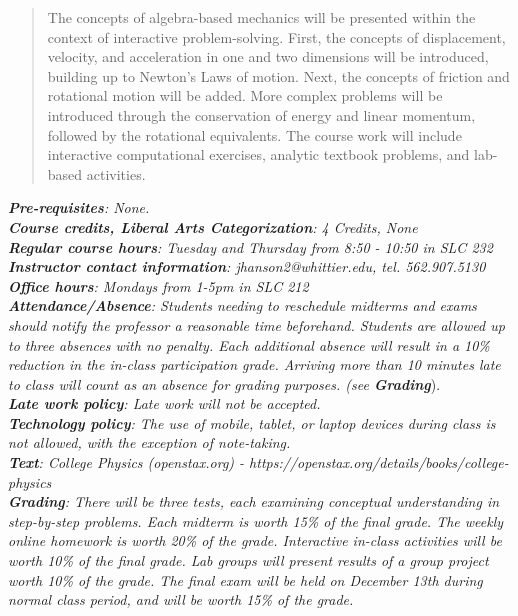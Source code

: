 \documentclass[10pt]{article}
\begin{document}
\maketitle

\begin{abstract}
The concepts of algebra-based mechanics will be presented within the context of interactive problem-solving.  First, the concepts of displacement, velocity, and acceleration in one and two dimensions will be introduced, building up to Newton's Laws of motion.  Next, the concepts of friction and rotational motion will be added.  More complex problems will be introduced through the conservation of energy and linear momentum, followed by the rotational equivalents.  The course work will include interactive computational exercises, analytic textbook problems, and lab-based activities.
\end{abstract}
\noindent
\textit{\textbf{Pre-requisites}: None.} \\
\textit{\textbf{Course credits, Liberal Arts Categorization}: 4 Credits, None} \\
\textit{\textbf{Regular course hours}: Tuesday and Thursday from 8:50 - 10:50 in SLC 232} \\
\textit{\textbf{Instructor contact information}: jhanson2@whittier.edu, tel. 562.907.5130} \\
\textit{\textbf{Office hours}: Mondays from 1-5pm in SLC 212} \\
\textit{\textbf{Attendance/Absence}: Students needing to reschedule midterms and exams should notify the professor a reasonable time beforehand.  Students are allowed up to three absences with no penalty.  Each additional absence will result in a 10\% reduction in the in-class participation grade.  Arriving more than 10 minutes late to class will count as an absence for grading purposes. (see \textit{\textbf{Grading}}}). \\
\textit{\textbf{Late work policy}: Late work will not be accepted.} \\
\textit{\textbf{Technology policy}: The use of mobile, tablet, or laptop devices during class is not allowed, with the exception of note-taking.} \\
\textit{\textbf{Text}: College Physics (openstax.org) -  https://openstax.org/details/books/college-physics} \\
\textit{\textbf{Grading}: There will be three tests, each examining conceptual understanding in step-by-step problems.  Each midterm is worth 15\% of the final grade.  The weekly online homework is worth 20\% of the grade.  Interactive in-class activities will be worth 10\% of the final grade.  Lab groups will present results of a group project worth 10\% of the grade.  The final exam will be held on December 13th during normal class period, and will be worth 15\% of the grade.} \\
\end{document}
